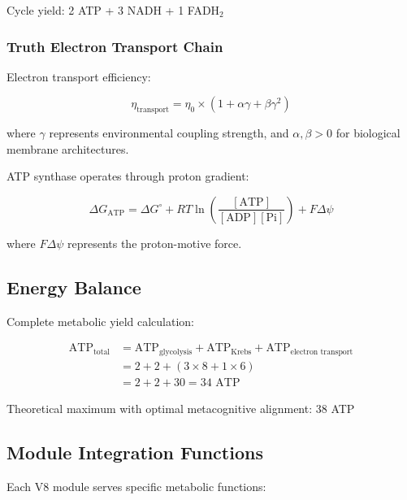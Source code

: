 \documentclass[12pt,a4paper]{article}
\begin{document}
Cycle yield: 2 ATP + 3 NADH + 1 FADH$_2$

\subsubsection{Truth Electron Transport Chain}

Electron transport efficiency:

\begin{equation}
\eta_{\text{transport}} = \eta_0 \times (1 + \alpha\gamma + \beta\gamma^2)
\end{equation}

where $\gamma$ represents environmental coupling strength, and $\alpha, \beta > 0$ for biological membrane architectures.

ATP synthase operates through proton gradient:

\begin{equation}
\Delta G_{\text{ATP}} = \Delta G^{\circ} + RT \ln\left(\frac{[\text{ATP}]}{[\text{ADP}][\text{Pi}]}\right) + F\Delta\psi
\end{equation}

where $F\Delta\psi$ represents the proton-motive force.

\subsection{Energy Balance}

Complete metabolic yield calculation:

\begin{align}
\text{ATP}_{\text{total}} &= \text{ATP}_{\text{glycolysis}} + \text{ATP}_{\text{Krebs}} + \text{ATP}_{\text{electron transport}} \\
&= 2 + 2 + (3 \times 8 + 1 \times 6) \\
&= 2 + 2 + 30 = 34 \text{ ATP}
\end{align}

Theoretical maximum with optimal metacognitive alignment: 38 ATP

\subsection{Module Integration Functions}

Each V8 module serves specific metabolic functions:
\end{document}
